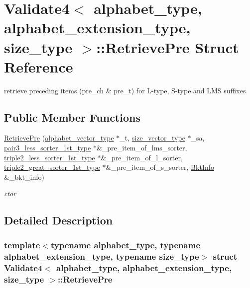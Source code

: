 \hypertarget{struct_validate4_1_1_retrieve_pre}{}\section{Validate4$<$ alphabet\+\_\+type, alphabet\+\_\+extension\+\_\+type, size\+\_\+type $>$\+:\+:Retrieve\+Pre Struct Reference}
\label{struct_validate4_1_1_retrieve_pre}


retrieve preceding items (pre\+\_\+ch \& pre\+\_\+t) for L-\/type, S-\/type and L\+MS suffixes  


\subsection*{Public Member Functions}
\begin{DoxyCompactItemize}
\item 
\hyperlink{struct_validate4_1_1_retrieve_pre_abd6dc10b410baedef42cc2261ca8f143}{Retrieve\+Pre} (\hyperlink{class_validate4_a49c80b3d101be19542a4341c2387603a}{alphabet\+\_\+vector\+\_\+type} $\ast$\+\_\+t, \hyperlink{class_validate4_a46ea31a0a4b23f583806792160421d15}{size\+\_\+vector\+\_\+type} $\ast$\+\_\+sa, \hyperlink{class_validate4_aff3135d55f749682df7e0f97c82a6769}{pair3\+\_\+less\+\_\+sorter\+\_\+1st\+\_\+type} $\ast$\&\+\_\+pre\+\_\+item\+\_\+of\+\_\+lms\+\_\+sorter, \hyperlink{class_validate4_a4c1bcea817e34f96d95c99e0694bbfc8}{triple2\+\_\+less\+\_\+sorter\+\_\+1st\+\_\+type} $\ast$\&\+\_\+pre\+\_\+item\+\_\+of\+\_\+l\+\_\+sorter, \hyperlink{class_validate4_aa35a0ebf404821377118043d536be262}{triple2\+\_\+great\+\_\+sorter\+\_\+1st\+\_\+type} $\ast$\&\+\_\+pre\+\_\+item\+\_\+of\+\_\+s\+\_\+sorter, \hyperlink{struct_validate4_1_1_bkt_info}{Bkt\+Info} \&\+\_\+bkt\+\_\+info)
\begin{DoxyCompactList}\small\item\em ctor \end{DoxyCompactList}\end{DoxyCompactItemize}


\subsection{Detailed Description}
\subsubsection*{template$<$typename alphabet\+\_\+type, typename alphabet\+\_\+extension\+\_\+type, typename size\+\_\+type$>$\newline
struct Validate4$<$ alphabet\+\_\+type, alphabet\+\_\+extension\+\_\+type, size\+\_\+type $>$\+::\+Retrieve\+Pre}

